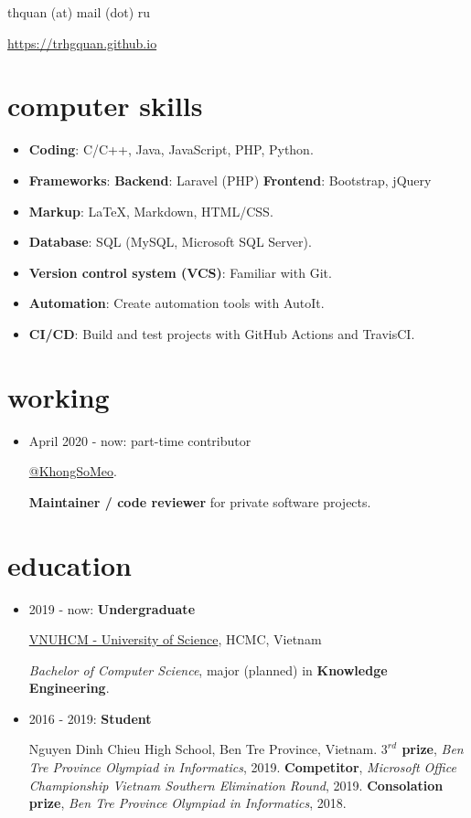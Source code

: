 \documentclass{article}
\renewcommand{\maketitle}{
\begin{multicols}{2}
\begin{flushleft}
{\huge\bfseries\theauthor}

\end{flushleft}
\columnbreak
\begin{flushright}
thquan (at) mail (dot) ru

\href{https://trhgquan.github.io}{https://trhgquan.github.io}
\end{flushright}
\end{multicols}
}
\begin{document}
\author{Quan, Tran Hoang}
\maketitle

\section{computer skills}
\begin{multicols}{2}
\begin{itemize}
\item \textbf{Coding}: C/C++, Java, JavaScript, PHP, Python.
\item \textbf{Frameworks}:
\subitem \textbf{Backend}: Laravel (PHP)
\subitem \textbf{Frontend}: Bootstrap, jQuery
\item \textbf{Markup}: \LaTeX, Markdown, HTML/CSS.
\columnbreak
\item \textbf{Database}: SQL (MySQL, Microsoft SQL Server).
\item \textbf{Version control system (VCS)}: Familiar with Git.
\item \textbf{Automation}: Create automation tools with AutoIt.
\item \textbf{CI/CD}: Build and test projects with GitHub Actions and TravisCI.
\end{itemize}
\end{multicols}

\section{working}
\begin{itemize}
\item April 2020 - now: part-time contributor

\href{https://github.com/khongsomeo}{@KhongSoMeo}.

\textbf{Maintainer / code reviewer} for private software projects.
\end{itemize}

\section{education}
\begin{itemize}
\item 2019 - now: \textbf{Undergraduate}

\href{https://en.hcmus.edu.vn}{VNUHCM - University of Science},
HCMC, Vietnam

\textit{Bachelor of Computer Science}, major (planned) in \textbf{Knowledge Engineering}.

\item 2016 - 2019: \textbf{Student}

Nguyen Dinh Chieu High School, Ben Tre Province, Vietnam.
\subitem \textbf{$3^{rd}$ prize}, \textit{Ben Tre Province Olympiad in Informatics}, 2019.
\subitem \textbf{Competitor}, \textit{Microsoft Office Championship Vietnam Southern Elimination Round}, 2019.
\subitem \textbf{Consolation prize}, \textit{Ben Tre Province Olympiad in Informatics}, 2018.
\end{itemize}
\end{document}
